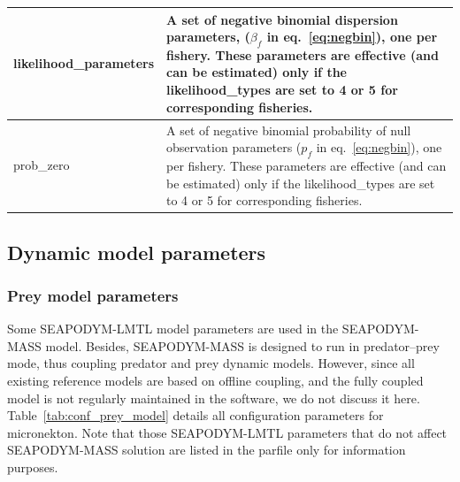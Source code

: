 \begin{table}[H]
\begin{tabular}{p{4.5cm}p{11.2cm}}
    {\ttfamily likelihood\_parameters} & A set of negative binomial dispersion parameters, ($\beta_f$ in eq.~\ref{eq:negbin}), one per fishery. These parameters are effective (and can be estimated) only if the {\ttfamily likelihood\_types} are set to 4 or 5 for corresponding fisheries. \\ \hline 
    {\ttfamily prob\_zero} & A set of negative binomial probability of null observation parameters ($p_f$ in eq.~\ref{eq:negbin}), one per fishery. These parameters are effective (and can be estimated) only if the {\ttfamily likelihood\_types} are set to 4 or 5 for corresponding fisheries. \\ \hline
    \hline
\end{tabular}
\label{tab:configuration_likelihood}
\end{table}


\subsection{Dynamic model parameters}

\subsubsection{Prey model parameters}
\label{sec:prey_model}
Some SEAPODYM-LMTL model \citep{Lehodey1998, Lehodey2010, Lehodey2015} parameters are used in the SEAPODYM-MASS model. Besides, SEAPODYM-MASS is designed to run in predator--prey mode, thus coupling predator and prey dynamic models. However, since all existing reference models are based on offline coupling, and the fully coupled model is not regularly maintained in the software, we do not discuss it here. Table~\ref{tab:conf_prey_model}  details all configuration parameters for micronekton. Note that those SEAPODYM-LMTL parameters that do not affect SEAPODYM-MASS solution are listed in the parfile only for information purposes.  

